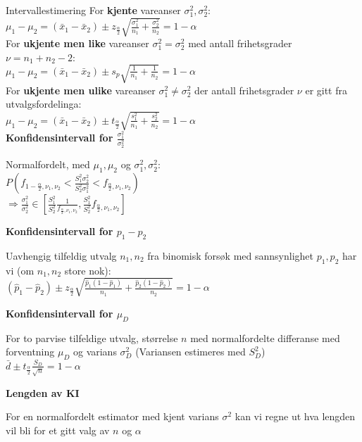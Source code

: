 \documentclass[final,hyperref={pdfpagelabels=false}]{beamer}
\begin{document}
\begin{frame}{}
\begin{columns}[t]
\begin{column}{.25\linewidth}
\begin{block}{\center Intervallestimering}
{					For \textbf{kjente} vareanser $\sigma_1^2, \sigma_2^2$: \\
					$\mu_1-\mu_2=(\bar x_1 - \bar x_2) \pm z_\frac{\alpha}{2}\sqrt{\frac{\sigma_1^2}{n_1}+\frac{\sigma_2^2}{n_2}}=1-\alpha$\\
					For \textbf{ukjente men like} vareanser $\sigma_1^2=\sigma_2^2$ med antall frihetsgrader $\nu = n_1 + n_2 - 2$:\\
					$\mu_1-\mu_2=(\bar x_1 - \bar x_2) \pm s_p\sqrt{\frac{1}{n_1}+\frac{1}{n_2}}=1-\alpha$\\
					For \textbf{ukjente men ulike} vareanser $\sigma_1^2\neq \sigma_2^2$ der antall frihetsgrader $\nu$ er gitt fra utvalgsfordelinga: \\
					$\mu_1-\mu_2=(\bar x_1 - \bar x_2) \pm t_\frac{\alpha}{2}\sqrt{\frac{s_1^2}{n_1}+\frac{s_2^2}{n_2}}=1-\alpha$\\
				}
				\center\footnotesize\textbf{Konfidensintervall for $\frac{\sigma_1^2}{\sigma_2^2}$}\\
				{\footnotesize\raggedright
					Normalfordelt, med $\mu_1,\mu_2$ og $\sigma_1^2,\sigma_2^2$:\\
					$P\left( f_{1-\frac{\alpha}{2},\nu_1,\nu_2} < \frac{S_1^2\sigma_2^2}{S_2^2\sigma_1^2} <  f_{\frac{\alpha}{2},\nu_1,\nu_2}\right)$\\
					$\Rightarrow \frac{\sigma_1^2}{\sigma_2^2} \in \left[ \frac{S_1^2}{S_2^2}\frac{1}{f_{\frac{\alpha}{2},\nu_1,\nu_2}}, \frac{S_1^2}{S_2^2}f_{\frac{\alpha}{2},\nu_1,\nu_2} \right] $
				}
				\center\footnotesize\textbf{Konfidensintervall for $p_1-p_2$}\\
				{\footnotesize\raggedright
					Uavhengig tilfeldig utvalg $n_1,n_2$ fra binomisk forsøk med sannsynlighet $p_1,p_2$ har vi (om $n_1,n_2$ store nok):\\
					$(\hat p_1 - \hat p_2) \pm z_\frac{\alpha}{2} \sqrt{\frac{\hat p_1 (1 - \hat p_1)}{n_1} + \frac{\hat p_2 (1 - \hat p_2)}{n_2}}=1-\alpha$
				}
				\center\footnotesize\textbf{Konfidensintervall for $\mu_D$}\\
				{\footnotesize\raggedright
					For to parvise tilfeldige utvalg, størrelse $n$ med normalfordelte differanse med forventning $\mu_D$ og varians $\sigma^2_D$ (Variansen estimeres med $S_D^2$) \\
					$\bar d \pm t_\frac{\alpha}{2}\frac{S_D}{\sqrt{n}}=1-\alpha$\\
				}
				\center\footnotesize\textbf{Lengden av KI}\\
				{\footnotesize\raggedright
					For en normalfordelt estimator med kjent varians $\sigma^2$ kan vi regne ut hva lengden vil bli for et gitt valg av $n$ og $\alpha$ \\
}
\end{block}
\end{column}
\end{columns}
\end{frame}
\end{document}
